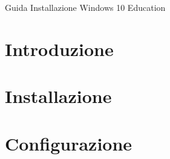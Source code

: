 \documentclass[a4paper]{article}
\begin{document}
{\LARGE Guida Installazione Windows 10 Education}

\pagebreak{}
\thispagestyle{header-pages}
\tableofcontents

\pagebreak{}
\thispagestyle{header-pages}

\section{Introduzione}

\pagebreak{}


\section{Installazione}

\pagebreak{}

\thispagestyle{header-pages}
\section{Configurazione}

\end{document}
